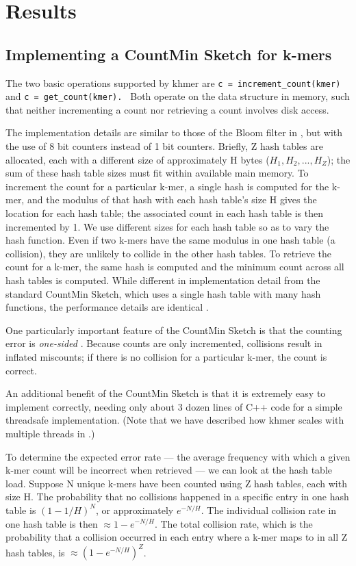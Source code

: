\documentclass[10pt]{article}
\begin{document}
\section*{Results}

\subsection*{Implementing a CountMin Sketch for k-mers}

The two basic operations supported by khmer are {\tt c =
  increment\_count(kmer) } and {\tt c = get\_count(kmer). } Both
operate on the data structure in memory, such that neither
incrementing a count nor retrieving a count involves disk access.

The implementation details are similar to those of the Bloom filter in
\cite{Pell2012}, but with the use of 8 bit counters instead of 1 bit
counters.  Briefly, Z hash tables are allocated, each with a different
size of approximately H bytes ($H_1, H_2, ..., H_Z$); the sum of these
hash table sizes must fit within available main memory.  To increment
the count for a particular k-mer, a single hash is computed for the
k-mer, and the modulus of that hash with each hash table's size H
gives the location for each hash table; the associated count in each
hash table is then incremented by 1.  We use different sizes for each
hash table so as to vary the hash function.  Even if two k-mers have
the same modulus in one hash table (a collision), they are unlikely to
collide in the other hash tables.  To retrieve the count for a k-mer,
the same hash is computed and the minimum count across all hash tables
is computed.  While different in implementation detail from the
standard CountMin Sketch, which uses a single hash table with many
hash functions, the performance details are identical \cite{Pell2012}.

One particularly important feature of the CountMin Sketch is that the
counting error is {\em one-sided} \cite{Cormode2005}.  Because counts
are only incremented, collisions result in inflated miscounts; if
there is no collision for a particular k-mer, the count is correct.

An additional benefit of the CountMin Sketch is that it is extremely
easy to implement correctly, needing only about 3 dozen lines of C++
code for a simple threadsafe implementation.  (Note that we have
described how khmer scales with multiple threads in
\cite{McDonald2013}.)

To determine the expected error rate --- the average frequency with
which a given k-mer count will be incorrect when retrieved --- we can
look at the hash table load. Suppose N unique k-mers have been counted
using Z hash tables, each with size H.  The probability that no
collisions happened in a specific entry in one hash table is
$(1-1/H)^{N}$, or approximately $e^{-N/H}$. The individual collision
rate in one hash table is then $\approx 1-e^{-N/H}$. The total
collision rate, which is the probability that a collision occurred in
each entry where a k-mer maps to in all Z hash tables, is $\approx
(1-e^{-N/H})^{Z}$.
\end{document}
